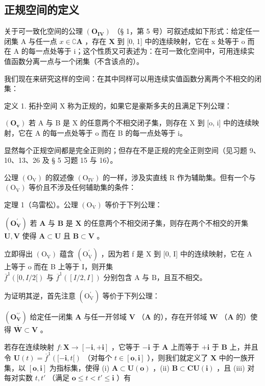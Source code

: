 \subsection{正规空间的定义}

关于可一致化空间的公理 \((\mathbf{O}_{\mathbf{IV}})\) （§ 1，第 5 号）可叙述成如下形式：给定任一闭集 A 与任一点 \(x \in \complement \mathbf{A}\) ，存在 \(\mathbf{X}\) 到 {[}0, 1{]} 中的连续映射，它在 x 处等于 o 而在 A 的每一点处等于 i；这个性质又可表述为：在可一致化空间中，可用连续实值函数分离一点与一个闭集（不含该点的）。

我们现在来研究这样的空间：在其中同样可以用连续实值函数分离两个不相交的闭集：

定义 1. 拓扑空间 X 称为正规的，如果它是豪斯多夫的且满足下列公理：

\((\mathbf{O}_{\mathbf{v}})\) 若 A 与 B 是 X 的任意两个不相交闭子集，则存在 X 到 {[}o, i{]} 中的连续映射，它在 A 的每一点处等于 o 而在 B 的每一点处等于 i。

显然每个正规空间都是完全正则的；但存在不是正规的完全正则空间（见习题 9、10、13、26 及 § 5 习题 15 与 16）。

公理 \((\mathrm{O}_{\mathrm{V}})\) 的叙述像 \((\mathrm{O}_{\mathrm{IV}})\) 的一样，涉及实直线 R 作为辅助集。但有一个与 \((\mathrm{O}_{\mathrm{V}})\) 等价且不涉及任何辅助集的条件：

定理 1（乌雷松）。公理 \((\mathrm{O}_{\mathrm{V}})\) 等价于下列公理：

\((\mathbf{O}_{\mathbf{V}}^{\prime})\) 若 \(\mathbf{A}\) 与 \(\mathbf{B}\) 是 \(\mathbf{X}\) 的任意两个不相交闭子集，则存在两个不相交的开集 \(\mathbf{U}, \mathbf{V}\) 使得 \(\mathbf{A} \subset \mathbf{U}\) 且 \(\mathbf{B} \subset \mathbf{V}\) 。

立即得出 \((\mathrm{O}_{\mathrm{V}})\) 蕴含 \((\mathrm{O}_{\mathrm{V}}^{\prime})\) ，因为若 f 是 X 到 {[}0, I{]} 中的连续映射，它在 A 上等于 o 而在 B 上等于 I，则开集 \(\overline{f}^{1}([0, I/2[)\text{ 与 }\overline{f}^{1}([I/2,I])\text{ 分别包含 A 与 B，且互不相交。}\)

为证明其逆，首先注意 \((\mathrm{O}_{\mathrm{V}}^{\prime})\) 等价于下列公理：

\((\mathbf{O}_{\mathbf{V}}^{\prime \prime})\) 给定任一闭集 \(\mathbf{A}\) 与任一开邻域 \(\mathbf{V}\) （\(\mathbf{A}\) 的），存在开邻域 \(\mathbf{W}\) （\(\mathbf{A}\) 的）使得 \(\overline{\mathbf{W}} \subset \mathbf{V}\) 。

若存在连续映射 \(f: \mathbf{X} \to [-\mathbf{i}, +\mathbf{i}]\) ，它等于 \(-\mathbf{i}\) 于 \(\mathbf{A}\) 上而等于 \(+\mathbf{i}\) 于 \(\mathbf{B}\) 上，并且令 \(\mathbf{U}(t) = \overline{f}^1([-\mathbf{i}, t[)\) （对每个 \(t \in [\mathbf{o}, \mathbf{i}]\) ），则我们就定义了 \(\mathbf{X}\) 中的一族开集，以 \([\mathbf{o}, \mathbf{i}]\) 为指标集，使得 (i) \(\mathbf{A} \subset \mathbf{U}(\mathbf{o})\) ，(ii) \(\mathbf{B} \subset \mathbf{C}\mathbf{U}(\mathbf{i})\) ，且 (iii) 对每对实数 \(t, t'\) （满足 \(\mathbf{o} \leqslant t < t' \leqslant \mathbf{i}\) ）有

